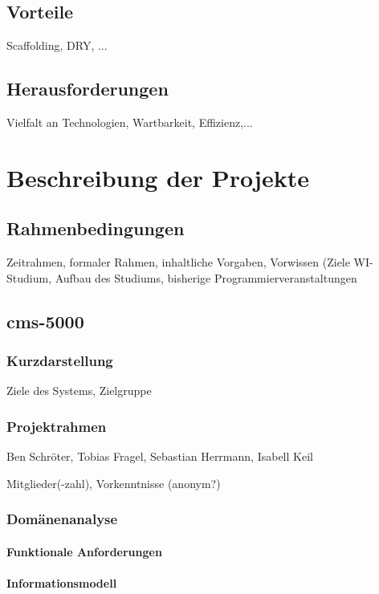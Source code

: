 \documentclass[11pt,a4paper,ngerman]{book}
\begin{document}
\section{Vorteile}
Scaffolding, DRY, ...

\section{Herausforderungen}
Vielfalt an Technologien, Wartbarkeit, Effizienz,...



\chapter{Beschreibung der Projekte}

\section{Rahmenbedingungen}
Zeitrahmen, formaler Rahmen, inhaltliche Vorgaben, Vorwissen (Ziele WI-Studium, Aufbau des Studiums, bisherige Programmierveranstaltungen


\section{cms-5000}

\subsection{Kurzdarstellung}
Ziele des Systems, Zielgruppe

\subsection{Projektrahmen}
Ben Schröter, Tobias Fragel, Sebastian Herrmann, Isabell Keil

Mitglieder(-zahl), Vorkenntnisse (anonym?)

\subsection{Domänenanalyse}
\subsubsection{Funktionale Anforderungen}
\subsubsection{Informationsmodell}
\end{document}

